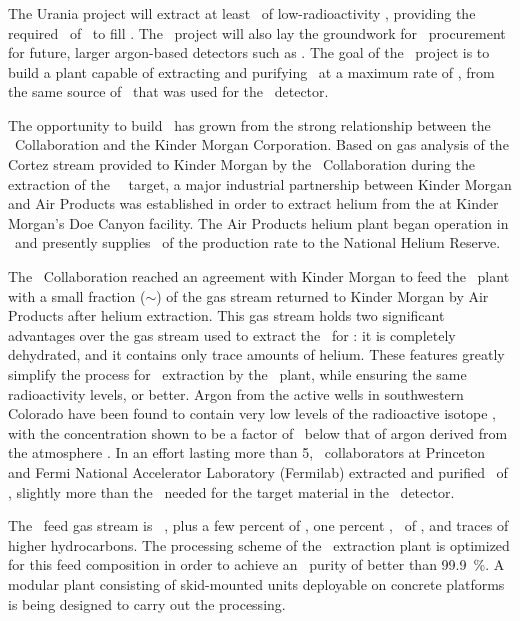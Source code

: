 \subsubsection{\Urania}
The Urania project will extract at least \UraniaTotalDSkProduction\ of low-radioactivity \UAr, providing the required \DSkTotalMass\ of \UAr\ to fill \DSk.   The \Urania\ project will also lay the groundwork for \UAr\ procurement for future, larger argon-based detectors such as \Argo.  The goal of the \Urania\ project is to build a plant capable of extracting and purifying \UAr\ at a maximum rate of \UraniaUArRate, from the same source of \UAr\ that was used for the \DSf\ detector.  

The opportunity to build \Urania\ has grown from the strong relationship between the \DS\ Collaboration and the Kinder Morgan Corporation. Based on gas analysis of the Cortez stream provided to Kinder Morgan by the \DS\ Collaboration during the extraction of the \DSf\ \UAr\ target, a major industrial partnership between Kinder Morgan and Air Products was established in order to extract helium from the  at Kinder Morgan's Doe Canyon facility.  The Air Products helium plant began operation in \UraniaHeStartDate\ and presently supplies \UraniaHeNationalReserveFractionEquivalentRate\ of the production rate to the National Helium Reserve. 

The \DS\ Collaboration reached an agreement with Kinder Morgan to feed the \Urania\ plant with a small fraction ($\sim$\UraniaGasFeedFraction) of the gas stream returned to Kinder Morgan by Air Products after helium extraction.  This gas stream holds two significant advantages over the gas stream used to extract the \UAr\ for \DSf: it is completely dehydrated,  and it contains only trace amounts of helium. These features greatly simplify the process for \UAr\ extraction by the \Urania\ plant, while ensuring the same radioactivity levels, or better.  Argon from the active  wells in southwestern Colorado have been found to contain very low levels of the radioactive isotope  , with the concentration shown to be a factor of \DSfUArArThreeNineDepletion\ below that of argon derived from the atmosphere \cite{Agnes:2016fz}. In an effort lasting more than \SI{5}{\years}, \DSf\ collaborators at Princeton and Fermi National Accelerator Laboratory (Fermilab) extracted and purified \DSfUArMassDelivered\ of \UAr, slightly more than the  \DSfTotalMass\ needed for the target material in the \DSf\ detector. 

The \Urania\ feed gas stream is \UraniaCOTwoFeedFraction\ , plus a few percent of , one percent , \UraniaArFeedFraction\ of \UAr, and traces of higher hydrocarbons.  The processing scheme of the \UAr\ extraction plant is optimized for this feed composition in order to achieve an \UAr\ purity of better than \SI{99.9}{\percent}.  A modular plant consisting of skid-mounted units deployable on concrete platforms is being designed to carry out the processing.

